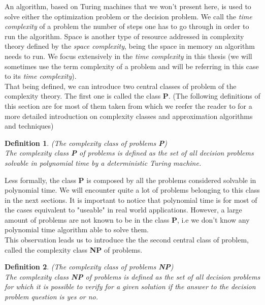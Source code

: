 \documentclass[a4paper]{book}
\newtheorem{definition}{Definition}
\begin{document}
An algorithm, based on Turing machines that we won't present here, is used to solve either the optimization problem or the decision problem. We call the \textit{time complexity} of a problem the number of steps one has to go through in order to run the algorithm. Space is another type of resource addressed in complexity theory defined by the \textit{space complexity}, being the space in memory an algorithm needs to run. We focus extensively in the \textit{time complexity} in this thesis (we will sometimes use the term complexity of a problem and will be referring in this case to its \textit{time complexity}).\\
That being defined, we can introduce two central classes of problem of the complexity theory. 
The first one is called the class \textbf{P}. (The following definitions of this section are for most of them taken from \cite{escoffier2005approximation} which we reefer the reader to for a more detailed introduction on complexity classes and approximation algorithms and techniques)
\begin{definition}{\emph{(The complexity class of problems \textbf{P}) }}\\
The complexity class \emph{\textbf{P}} of problems is defined as the set of all decision problems solvable in polynomial time by a deterministic Turing machine.
\end{definition}

Less formally, the class \textbf{P} is composed by all the problems considered solvable in polynomial time. We will encounter quite a lot of problems belonging to this class in the next sections. It is important to notice that polynomial time is for most of the cases equivalent to "useable" in real world applications. However, a large amount of problems are not known to be in the class \textbf{P}, i.e we don't know any polynomial time algorithm able to solve them.  \\

This observation leads us to introduce the the second central class of problem, called the complexity class \textbf{NP} of problems.
\begin{definition}{\emph{(The complexity class of problems \textbf{NP})}}\\
The complexity class \emph{\textbf{NP}} of problems is defined as the set of all decision problems for which it is possible to verify for a given solution if the answer to the decision problem question is yes or no.
\end{definition}
\end{document}
